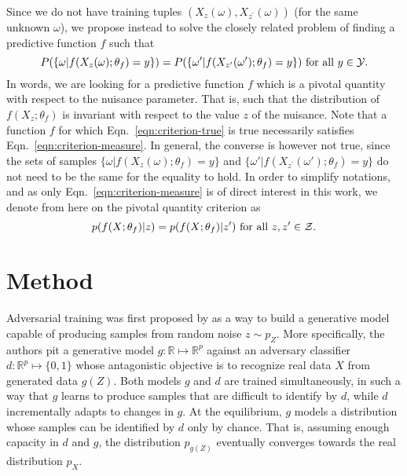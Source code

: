 \documentclass{article}
\theoremstyle{plain}
\begin{document}
Since we do not have training tuples $(X_{z}(\omega),
X_{z^\prime}(\omega))$ (for the same unknown $\omega$), we propose instead to
solve the closely related problem of finding a predictive function $f$ such that
\begin{equation}\label{eqn:criterion-measure}
    P(\{ \omega | f(X_{z}(\omega) ; \theta_f) = y \} ) = P( \{ \omega' | f(X_{z^\prime}(\omega') ; \theta_f) = y\}) \text{ for all $y \in {\cal Y}$}.
\end{equation}
In words, we are looking for a predictive function $f$ which is a pivotal
quantity \citep{degroot1986probability} with respect to the nuisance parameter.
That is, such that  the distribution of $f(X_z; \theta_f)$ is invariant
with respect to the value $z$ of the nuisance. Note that a function $f$ for which
Eqn.~\ref{eqn:criterion-true} is true necessarily satisfies
Eqn.~\ref{eqn:criterion-measure}. In general, the converse is however not true, since the
sets of samples $\{ \omega | f(X_{z}(\omega); \theta_f) = y \}$ and $\{
\omega' | f(X_{z^\prime}(\omega'); \theta_f) = y \}$ do not need to be the same
for the equality to hold.
In order to simplify notations,
and as only Eqn.~\ref{eqn:criterion-measure} is
of direct interest in this work, we denote from here on
the pivotal quantity criterion as
\begin{equation}\label{eqn:criterion}
    p(f(X ; \theta_f) | z ) = p(f(X ; \theta_f) | z^\prime ) \text{ for all $z,z^\prime \in  {\cal Z}$.}
\end{equation}



\section{Method}
\label{sec:method}

Adversarial training was first proposed by \cite{goodfellow2014generative} as a
way to build a generative model capable of producing samples from random noise
$z \sim p_Z$. More specifically, the authors pit a generative model $g: \mathbb{R}
\mapsto \mathbb{R}^p$ against an adversary classifier $d : \mathbb{R}^p \mapsto \{
0, 1\}$ whose antagonistic objective is to recognize real data $X$ from generated data $g(Z)$. Both
models $g$ and $d$ are trained simultaneously, in such a way that $g$ learns to
produce samples that are difficult to identify by $d$, while $d$ incrementally
adapts to changes in $g$. At the equilibrium, $g$ models a distribution whose
samples can be identified by $d$ only by chance. That is, assuming enough
capacity in $d$ and  $g$, the distribution $p_{g(Z)}$ eventually converges
towards the real distribution $p_X$.
\end{document}

